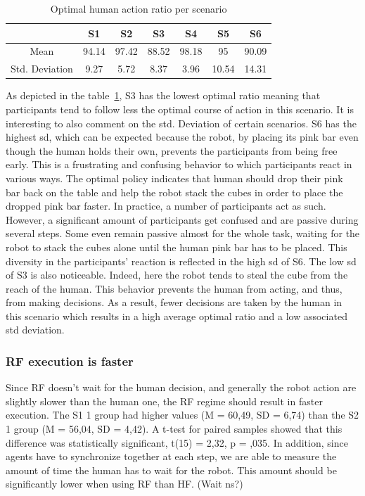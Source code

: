 \begin{table}
    \caption{Optimal human action ratio per scenario}
    \begin{center}
    \begin{tabular}{c|c|c|c|c|c|c|}
        \cline{2-7}
                                                & S1    & S2    & S3    & S4    & S5    & S6\\
        \hline
        \multicolumn{1}{|c|}{Mean}              & 94.14 & 97.42 & 88.52 & 98.18 & 95    & 90.09 \\
        \hline
        \multicolumn{1}{|c|}{Std. Deviation}    & 9.27  & 5.72  & 8.37  & 3.96  & 10.54 & 14.31 \\
        \hline
    \end{tabular}
    \end{center}
    \label{tab:optimal_human_ratio}
\end{table}

As depicted in the table~\ref{tab:optimal_human_ratio}, S3 has the lowest optimal ratio meaning that participants tend to follow less the optimal course of action in this scenario. It is interesting to also comment on the std. Deviation of certain scenarios. S6 has the highest sd, which can be expected because the robot, by placing its pink bar even though the human holds their own, prevents the participants from being free early. This is a frustrating and confusing behavior to which participants react in various ways. The optimal policy indicates that human should drop their pink bar back on the table and help the robot stack the cubes in order to place the dropped pink bar faster. In practice, a number of participants act as such. However, a significant amount of participants get confused and are passive during several steps. Some even remain passive almost for the whole task, waiting for the robot to stack the cubes alone until the human pink bar has to be placed. This diversity in the participants' reaction is reflected in the high sd of S6.
The low sd of S3 is also noticeable. Indeed, here the robot tends to steal the cube from the reach of the human. This behavior prevents the human from acting, and thus, from making decisions. As a result, fewer decisions are taken by the human in this scenario which results in a high average optimal ratio and a low associated std deviation. 

\subsubsection*{RF execution is faster}
Since RF doesn't wait for the human decision, and generally the robot action are slightly slower than the human one, the RF regime should result in faster execution.
The S1 1 group had higher values (M = 60,49, SD = 6,74) than the S2 1 group (M = 56,04, SD = 4,42). A t-test for paired samples showed that this difference was statistically significant, t(15) = 2,32, p = ,035.
In addition, since agents have to synchronize together at each step, we are able to measure the amount of time the human has to wait for the robot. This amount should be significantly lower when using RF than HF. (Wait ns?)

